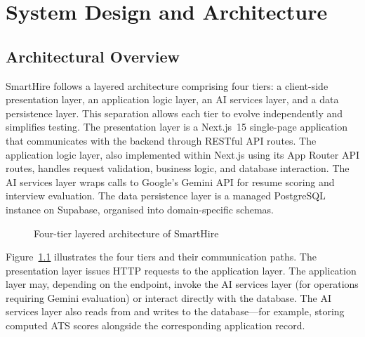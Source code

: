 \setcounter{chapter}{3}
\chapter{System Design and Architecture}
\label{ch:design}

\section{Architectural Overview}
\label{sec:arch-overview}

SmartHire follows a layered architecture comprising four tiers: a client-side presentation layer, an application logic layer, an AI services layer, and a data persistence layer. This separation allows each tier to evolve independently and simplifies testing. The presentation layer is a Next.js~15 single-page application that communicates with the backend through RESTful API routes. The application logic layer, also implemented within Next.js using its App Router API routes, handles request validation, business logic, and database interaction. The AI services layer wraps calls to Google's Gemini API for resume scoring and interview evaluation. The data persistence layer is a managed PostgreSQL instance on Supabase, organised into domain-specific schemas.

\begin{figure}[htbp]
\centering
{}
\caption{Four-tier layered architecture of SmartHire}
\label{fig:layered-arch}
\end{figure}

Figure~\ref{fig:layered-arch} illustrates the four tiers and their communication paths. The presentation layer issues HTTP requests to the application layer. The application layer may, depending on the endpoint, invoke the AI services layer (for operations requiring Gemini evaluation) or interact directly with the database. The AI services layer also reads from and writes to the database---for example, storing computed ATS scores alongside the corresponding application record.

